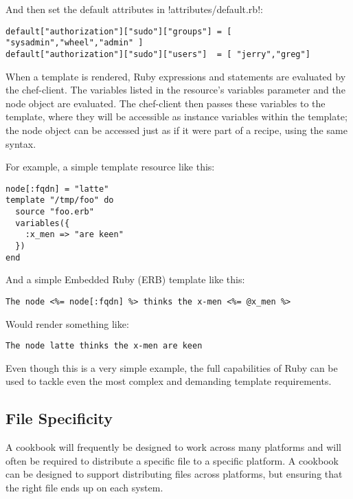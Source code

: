 And then set the default attributes in \inline!attributes/default.rb!:

\begin{lstlisting}[label=lst:cookbook-templates3]
default["authorization"]["sudo"]["groups"] = [ "sysadmin","wheel","admin" ]
default["authorization"]["sudo"]["users"]  = [ "jerry","greg"]
\end{lstlisting}

When a template is rendered, Ruby expressions and statements are evaluated by the chef-client. The variables listed in the resource’s variables parameter and the node object are evaluated. The chef-client then passes these variables to the template, where they will be accessible as instance variables within the template; the node object can be accessed just as if it were part of a recipe, using the same syntax.

For example, a simple template resource like this:

\begin{lstlisting}[label=lst:cookbook-templates4]
node[:fqdn] = "latte"
template "/tmp/foo" do
  source "foo.erb"
  variables({
    :x_men => "are keen"
  })
end
\end{lstlisting}

And a simple Embedded Ruby (ERB) template like this:

\begin{lstlisting}[label=lst:cookbook-templates5]
The node <%= node[:fqdn] %> thinks the x-men <%= @x_men %>
\end{lstlisting}

Would render something like:

\begin{lstlisting}[label=lst:cookbook-templates6]
The node latte thinks the x-men are keen
\end{lstlisting}

Even though this is a very simple example, the full capabilities of Ruby can be used to tackle even the most complex and demanding template requirements.

\subsection{File Specificity}

A cookbook will frequently be designed to work across many platforms and will often be required to distribute a specific file to a specific platform. A cookbook can be designed to support distributing files across platforms, but ensuring that the right file ends up on each system.

